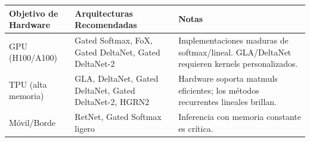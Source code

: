 \begin{table}[H]
\centering
\small
\begin{tabularx}{0.95\linewidth}{Xp{3.5cm}p{3.5cm}}
\toprule
\textbf{Objetivo de Hardware} & \textbf{Arquitecturas Recomendadas} & \textbf{Notas} \\
\midrule
GPU (H100/A100) & Gated Softmax, FoX, Gated DeltaNet, Gated DeltaNet-2 & Implementaciones maduras de softmax/lineal. GLA/DeltaNet requieren kernels personalizados. \\
TPU (alta memoria) & GLA, DeltaNet, Gated DeltaNet, Gated DeltaNet-2, HGRN2 & Hardware soporta matmuls eficientes; los métodos recurrentes lineales brillan. \\
Móvil/Borde & RetNet, Gated Softmax ligero & Inferencia con memoria constante es crítica. \\
\bottomrule
\end{tabularx}
\end{table}

